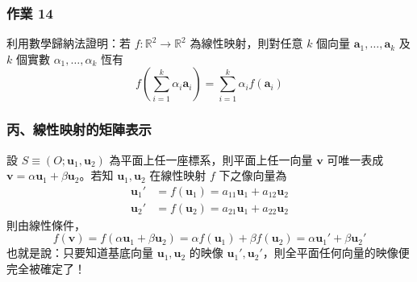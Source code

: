 \subsubsection*{作業 14}
利用數學歸納法證明：若 $f: \mathbb{R}^2 \to \mathbb{R}^2$ 為線性映射，則對任意 $k$ 個向量 $\mathbf{a}_1, \dots, \mathbf{a}_k$ 及 $k$ 個實數 $\alpha_1, \dots, \alpha_k$ 恆有
\[ f\left(\sum_{i=1}^k \alpha_i \mathbf{a}_i\right) = \sum_{i=1}^k \alpha_i f(\mathbf{a}_i) \]

\subsubsection*{丙、線性映射的矩陣表示}

設 $S \equiv (O; \mathbf{u}_1, \mathbf{u}_2)$ 為平面上任一座標系，則平面上任一向量 $\mathbf{v}$ 可唯一表成 $\mathbf{v} = \alpha\mathbf{u}_1 + \beta\mathbf{u}_2$。若知 $\mathbf{u}_1, \mathbf{u}_2$ 在線性映射 $f$ 下之像向量為
\begin{align}
\mathbf{u}_1' &= f(\mathbf{u}_1) = a_{11}\mathbf{u}_1 + a_{12}\mathbf{u}_2 \label{eq:b4-1-3-7} \\
\mathbf{u}_2' &= f(\mathbf{u}_2) = a_{21}\mathbf{u}_1 + a_{22}\mathbf{u}_2 \nonumber
\end{align}
則由線性條件，
\[ f(\mathbf{v}) = f(\alpha\mathbf{u}_1 + \beta\mathbf{u}_2) = \alpha f(\mathbf{u}_1) + \beta f(\mathbf{u}_2) = \alpha\mathbf{u}_1' + \beta\mathbf{u}_2' \]
也就是說：只要知道基底向量 $\mathbf{u}_1, \mathbf{u}_2$ 的映像 $\mathbf{u}_1', \mathbf{u}_2'$，則全平面任何向量的映像便完全被確定了！

